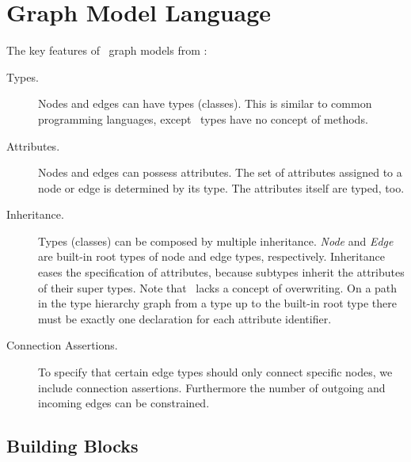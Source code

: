 \chapter{Graph Model Language}
The key features of \GrG\ graph models from \cite{geiss}:

\begin{description}
\item[Types.] Nodes and edges can have types (classes). This is similar to common programming languages, except \GrG\ types have no concept of methods. 
\item[Attributes.] Nodes and edges can possess attributes. The set of attributes assigned to a node or edge is determined by its type. The attributes itself are typed, too.
\item[Inheritance.] Types (classes) can be composed by multiple inheritance. \emph{Node} and \emph{Edge} are built-in root types of node and edge types, respectively. Inheritance eases the specification of attributes, because subtypes inherit the attributes of their super types. Note that \GrG\ lacks a concept of overwriting. On a path in the type hierarchy graph from a type up to the built-in root type there must be exactly one declaration for each attribute identifier.
\item[Connection Assertions.] To specify that certain edge types should only connect specific nodes, we include connection assertions. Furthermore the number of outgoing and incoming edges can be constrained.
\end{description}

\section{Building Blocks}

